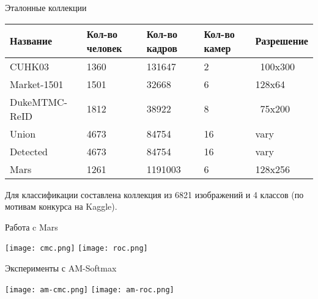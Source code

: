 \documentclass[14pt,mathserif,aspectratio=43,unicode]{beamer}
\begin{document}
\begin{frame}{Эталонные коллекции}

    \small

    \begin{tabular}{ p{2.5cm} | p{1.5cm} p{1.5cm} p{1.5cm} p{1.5cm} } 
        Название & Кол-во человек & Кол-во кадров & Кол-во камер & Разрешение \\
        \hline
        CUHK03 & 1360 & 131647 & 2 & ~100x300 \\
        Market-1501 & 1501 & 32668 & 6 & 128x64 \\
        DukeMTMC-ReID & 1812 & 38922 & 8 & ~75x200 \\
        Union & 4673 & 84754 & 16 & vary \\
        Detected & 4673 & 84754 & 16 & vary \\
        Mars & 1261 & 1191003 & 6 & 128x256
    \end{tabular}
    
    Для классификации составлена коллекция из 6821 изображений и 4 классов (по мотивам конкурса на Kaggle).
    
\end{frame}


\begin{frame}{Работа c Mars}

    \small

    \begin{center}
        \texttt{[image: cmc.png]}
        \texttt{[image: roc.png]}
    \end{center}
    
\end{frame}


\begin{frame}{Эксперименты с AM-Softmax}

    \begin{center}
        \texttt{[image: am-cmc.png]}
        \texttt{[image: am-roc.png]}
    \end{center}
    
\end{frame}
\end{document}
